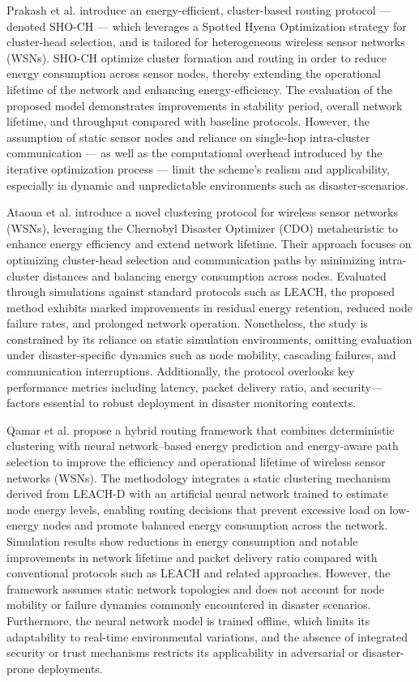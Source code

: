 \documentclass[journal]{IEEEtran}
\begin{document}
Prakash et al. \cite{prakash2025enhanced} introduce an energy-efficient, cluster-based routing protocol — denoted SHO-CH — which leverages a Spotted Hyena Optimization strategy for cluster-head selection, and is tailored for heterogeneous wireless sensor networks (WSNs). SHO-CH optimize cluster formation and routing in order to reduce energy consumption across sensor nodes, thereby extending the operational lifetime of the network and enhancing energy-efficiency. The evaluation of the proposed model demonstrates improvements in stability period, overall network lifetime, and throughput compared with baseline protocols. However, the assumption of static sensor nodes and reliance on single-hop intra-cluster communication — as well as the computational overhead introduced by the iterative optimization process — limit the scheme’s realism and applicability, especially in dynamic and unpredictable environments such as disaster-scenarios. 

Ataoua et al. \cite{ataoua_chernobyl_2025} introduce a novel clustering protocol for wireless sensor networks (WSNs), leveraging the Chernobyl Disaster Optimizer (CDO) metaheuristic to enhance energy efficiency and extend network lifetime. Their approach focuses on optimizing cluster-head selection and communication paths by minimizing intra-cluster distances and balancing energy consumption across nodes. Evaluated through simulations against standard protocols such as LEACH, the proposed method exhibits marked improvements in residual energy retention, reduced node failure rates, and prolonged network operation. Nonetheless, the study is constrained by its reliance on static simulation environments, omitting evaluation under disaster-specific dynamics such as node mobility, cascading failures, and communication interruptions. Additionally, the protocol overlooks key performance metrics including latency, packet delivery ratio, and security—factors essential to robust deployment in disaster monitoring contexts.

Qamar et al. \cite{qamar_hybrid_2025} propose a hybrid routing framework that combines deterministic clustering with neural network–based energy prediction and energy-aware path selection to improve the efficiency and operational lifetime of wireless sensor networks (WSNs). The methodology integrates a static clustering mechanism derived from LEACH-D with an artificial neural network trained to estimate node energy levels, enabling routing decisions that prevent excessive load on low-energy nodes and promote balanced energy consumption across the network. Simulation results show reductions in energy consumption and notable improvements in network lifetime and packet delivery ratio compared with conventional protocols such as LEACH and related approaches. However, the framework assumes static network topologies and does not account for node mobility or failure dynamics commonly encountered in disaster scenarios. Furthermore, the neural network model is trained offline, which limits its adaptability to real-time environmental variations, and the absence of integrated security or trust mechanisms restricts its applicability in adversarial or disaster-prone deployments.
\end{document}
